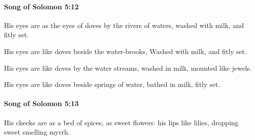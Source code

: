 		\paragraph{Song of Solomon 5:12} %
			\label{SONGOFSOLOMON-5-12}

			His eyes are as the eyes of doves by the rivers of waters, washed with milk, and fitly set.

			\begin{versebox}
					\item[BHS] 
					\item[LXX] 
					\item[ASV] His eyes are like doves beside the water-brooks, Washed with milk, and fitly set.
					\item[NIV] His eyes are like doves by the water streams, washed in milk, mounted like jewels.
					\item[NRSV] His eyes are like doves beside springs of water, bathed in milk, fitly set.
			\end{versebox}

		\paragraph{Song of Solomon 5:13} %
			\label{SONGOFSOLOMON-5-13}

			His cheeks are as a bed of spices, as sweet flowers: his lips like lilies, dropping sweet smelling myrrh.

